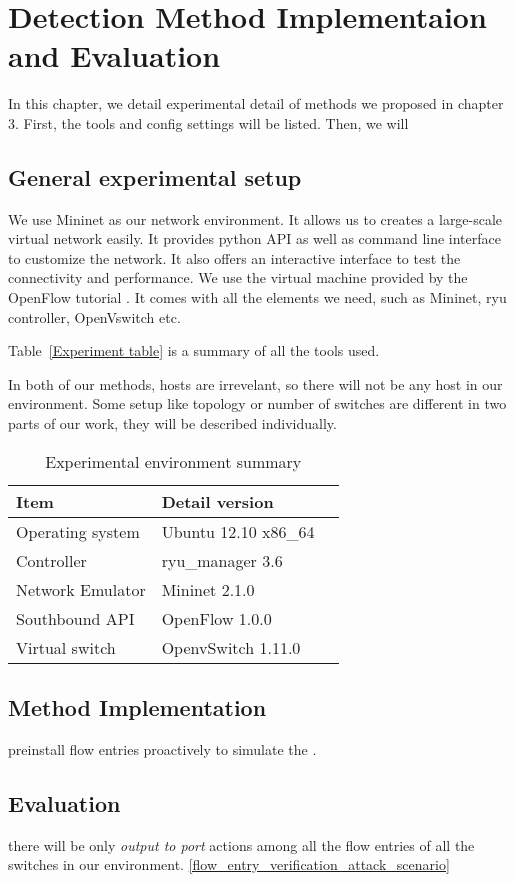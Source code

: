 \chapter{Detection Method Implementaion and Evaluation}
In this chapter, we detail experimental detail of methods we proposed in chapter 3. First, the tools and config settings will be listed. Then, we will 

\section{General experimental setup}
We use Mininet as our network environment. It allows us to creates a large-scale virtual network easily. 
It provides python API as well as command line interface to customize the network. It also offers an interactive interface to test the connectivity and performance. We use the virtual machine provided by the OpenFlow tutorial \cite{OFT}. It comes with all the elements we need, such as Mininet, ryu controller, OpenVswitch etc.

Table~\ref{Experiment table} is a summary of all the tools used. 

In both of our methods, hosts are irrevelant, so there will not be any host in our environment. Some setup like topology or number of switches are different in two parts of our work, they will be described individually.

\begin{table}[H]
\centering
\caption{Experimental environment summary}
\begin{tabular}{|l|p{4cm}|p{4.5cm}}
\hline Item & Detail version \\
\hline Operating system & Ubuntu 12.10 x86\_64 \\
\hline Controller & ryu\_manager 3.6 \\
\hline Network Emulator & Mininet 2.1.0\\
\hline Southbound API & OpenFlow 1.0.0 \\
\hline Virtual switch & OpenvSwitch 1.11.0 \\
\hline 
\end{tabular}
\label{table:Experiment table}
\end{table}


\section{Method Implementation}
preinstall flow entries proactively to simulate the . 
\subsection{}



\section{Evaluation}


there will be only \textit{output to port} actions among all the flow entries of all the switches in our environment. \ref{flow_entry_verification_attack_scenario} 